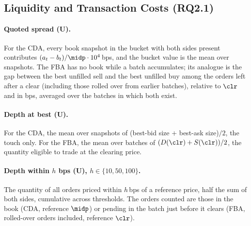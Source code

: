 \subsection{Liquidity and Transaction Costs (RQ2.1)}
\label{sec:metrics21}

\paragraph{Quoted spread (U).} For the CDA, every book snapshot in the
bucket with both sides present contributes $(a_t - b_t)/\midp \cdot
10^{4}$\,bps, and the bucket value is the mean over snapshots. The FBA
has no book while a batch accumulates; its analogue is the gap between the
best unfilled sell and the best unfilled buy among the orders left after
a clear (including those rolled over from earlier batches), relative to
$\clr$ and in bps, averaged over the batches in which both exist.

\paragraph{Depth at best (U).} For the CDA, the mean over snapshots of
(best-bid size $+$ best-ask size)$/2$, the touch only. For the FBA, the
mean over batches of $(D(\clr) + S(\clr))/2$, the quantity eligible to
trade at the clearing price.

\paragraph{Depth within $h$ bps (U), $h \in \{10, 50, 100\}$.} The
quantity of all orders priced within $h$\,bps of a reference price, half
the sum of both sides, cumulative across thresholds. The orders counted
are those in the book (CDA, reference $\midp$) or pending in the batch
just before it clears (FBA, rolled-over orders included, reference
$\clr$).


